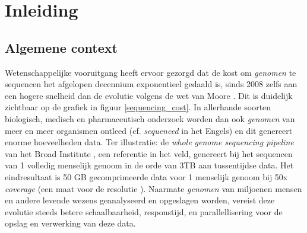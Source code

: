 \chapter{Inleiding}
\label{inleiding}

\section{Algemene context}

Wetenschappelijke vooruitgang heeft ervoor gezorgd dat de kost om \emph{genomen} te sequencen het afgelopen decennium exponentieel gedaald is, sinds 2008 zelfs aan een hogere snelheid dan de evolutie volgens de wet van Moore \cite{wetterstrand_sequencing_cost}. Dit is duidelijk zichtbaar op de grafiek in figuur \ref{sequencing_cost}. In allerhande soorten biologisch, medisch en pharmaceutisch onderzoek worden dan ook \emph{genomen} van meer en meer organismen ontleed (cf. \textit{sequenced} in het Engels) en dit genereert enorme hoeveelheden data. Ter illustratie: de \textit{whole genome sequencing pipeline} van het Broad Institute \cite{broad_institute}, een referentie in het veld, genereert bij het sequencen van 1 volledig menselijk genoom in de orde van 3TB aan tussentijdse data. Het eindresultaat is 50 GB gecomprimeerde data voor 1 menselijk genoom bij 50x \textit{coverage} (een maat voor de resolutie \cite{coverage_definition}). Naarmate \emph{genomen} van miljoenen mensen en andere levende wezens geanalyseerd en opgeslagen worden, vereist deze evolutie steeds betere schaalbaarheid, responstijd, en parallellisering voor de opslag en verwerking van deze data.\\

